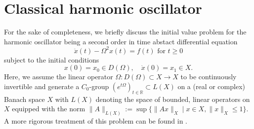 \documentclass[12pt]{article}
\numberwithin{equation}{section}
\numberwithin{equation}{section}
\begin{document}
\section{Classical harmonic oscillator}
	\label{SECTION_CLASSICAL_HARMONIC_OSCILLATOR}
	For the sake of completeness, 
	we briefly discuss the initial value problem for the harmonic oscillator being a second order in time abstact differential equation
	\begin{equation}
		\ddot{x}(t) - \Omega^{2} x(t) = f(t) \text{ for } t \geq 0
		\label{EQUATION_HARMONIC_OSCILLATOR_GENERAL}
	\end{equation}
	subject to the initial conditions
	\begin{equation}
		x(0) = x_{0} \in D(\Omega), \quad \dot{x}(0) = x_{1} \in X.
		\label{EQUATION_HARMONIC_OSCILLATOR_GENERAL_IC}
	\end{equation}
	Here, we assume the linear operator $\Omega \colon D(\Omega) \subset X \to X$
	to be continuously invertible and generate a $C_{0}$-group $(e^{t\Omega})_{t \in \mathbb{R}} \subset L(X)$ 
	on a (real or complex) Banach space $X$ with
	$L(X)$ denoting the space of bounded, linear operators on $X$ equipped with the norm
	$\|A\|_{L(X)} := \sup\big\{\|Ax\|_{X} \;|\; x \in X, \|x\|_{X} \leq 1\big\}$.
	A more rigorous treatment of this problem can be found in \cite[Section 3.14]{ArBaHieNeu2001}.
	
\end{document}
